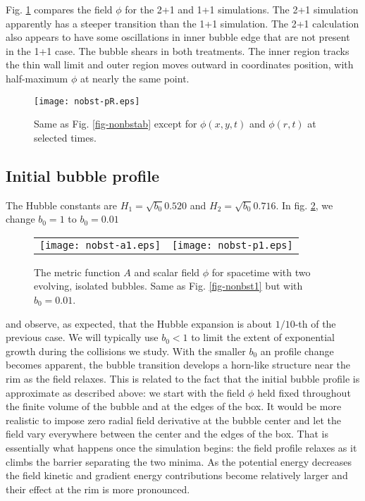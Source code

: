 \documentclass[preprintnumbers,eqsecnum,aps,prd,epsf,showpacs,nofootinbib
]{revtex4}
\begin{document}
Fig. \ref{fig-nonbstp} compares the field $\phi$ for the 2+1 and 1+1
simulations. The 2+1 simulation apparently has a steeper transition
than the 1+1 simulation. The 2+1 calculation also appears to have some
oscillations in inner bubble edge that are not present in the 1+1
case. The bubble shears in both treatments. The inner region tracks
the thin wall limit and outer region moves outward in coordinates
position, with half-maximum $\phi$ at nearly the same point.
\begin{figure}[htbp]
\begin{center}
\texttt{[image: nobst-pR.eps]}
\end{center}
\caption{Same as Fig. \ref{fig-nonbstab} except for
  $\phi(x,y,t)$ and $\phi(r,t)$ at selected times.
}
\label{fig-nonbstp}
\end{figure}

\subsection{Initial bubble profile}

The Hubble constants are $H_{1}=\sqrt{b_0} 0.520$ and $H_2= \sqrt{b_0}
0.716$. In fig. \ref{fig-nonbst2}, we change $b_0=1$ to $b_0=0.01$
\begin{figure}[htbp]
\begin{center}
\begin{tabular}{ll}
\texttt{[image: nobst-a1.eps]} &
\hspace{0.5cm}
\texttt{[image: nobst-p1.eps]}
\end{tabular}
\end{center}
\caption{The metric function $A$ and scalar field $\phi$ for spacetime
  with two evolving, isolated bubbles. Same as Fig. \ref{fig-nonbst1}
  but with $b_0=0.01$.}
\label{fig-nonbst2}
\end{figure}
and observe, as expected, that the Hubble expansion is about $1/10$-th
of the previous case. We will typically use $b_0 < 1$ to limit the
extent of exponential growth during the collisions we study. With the
smaller $b_0$ an profile change becomes apparent, the bubble
transition develops a horn-like structure near the rim as the field
relaxes.  This is related to the fact that the initial bubble profile
is approximate as described above: we start with the field $\phi$ held
fixed throughout the finite volume of the bubble and at the edges of
the box. It would be more realistic to impose zero radial field
derivative at the bubble center and let the field vary everywhere
between the center and the edges of the box. That is essentially what
happens once the simulation begins: the field profile relaxes as it
climbs the barrier separating the two minima. As the potential energy
decreases the field kinetic and gradient energy contributions become
relatively larger and their effect at the rim is more pronounced.
\end{document}
